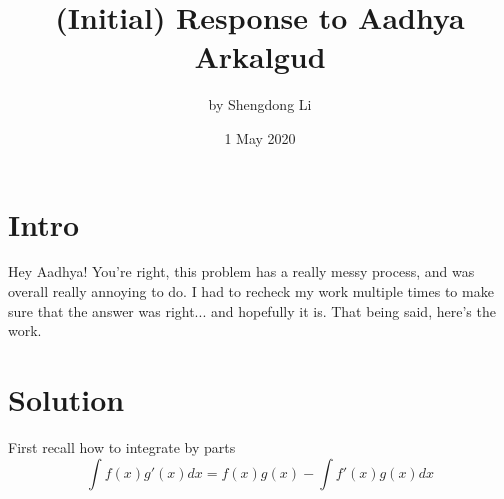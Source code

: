\documentclass[letterpaper, 12pt]{article}
\begin{document}
\title{(Initial) Response to Aadhya Arkalgud}
\author{by Shengdong Li}
\date{1 May 2020}
\maketitle
\section{Intro}
Hey Aadhya! You're right, this problem has a really messy process, and was overall really annoying to do. I had to recheck my work multiple times to make sure that the answer was right... and hopefully it is. That being said, here's the work.
\section{Solution}
    First recall how to integrate by parts
\begin{equation}
    \int f\left(x\right)g'\left(x\right)dx=f\left(x\right)g\left(x\right)-\int f'\left(x\right)g\left(x\right)dx
\end{equation}
\end{document}
